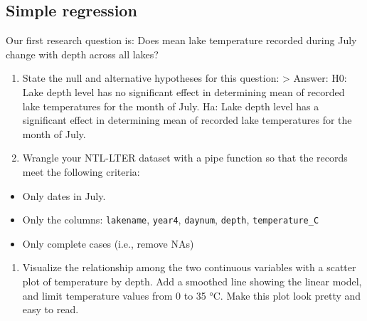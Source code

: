 \documentclass[
]{article}
\providecommand{\tightlist}{%
  \setlength{\itemsep}{0pt}\setlength{\parskip}{0pt}}
\begin{document}
\hypertarget{simple-regression}{%
\subsection{Simple regression}\label{simple-regression}}

Our first research question is: Does mean lake temperature recorded
during July change with depth across all lakes?

\begin{enumerate}
\def\labelenumi{\arabic{enumi}.}
\setcounter{enumi}{2}
\item
  State the null and alternative hypotheses for this question:
  \textgreater{} Answer: H0: Lake depth level has no significant effect
  in determining mean of recorded lake temperatures for the month of
  July. Ha: Lake depth level has a significant effect in determining
  mean of recorded lake temperatures for the month of July.
\item
  Wrangle your NTL-LTER dataset with a pipe function so that the records
  meet the following criteria:
\end{enumerate}

\begin{itemize}
\tightlist
\item
  Only dates in July.
\item
  Only the columns: \texttt{lakename}, \texttt{year4}, \texttt{daynum},
  \texttt{depth}, \texttt{temperature\_C}
\item
  Only complete cases (i.e., remove NAs)
\end{itemize}

\begin{enumerate}
\def\labelenumi{\arabic{enumi}.}
\setcounter{enumi}{4}
\tightlist
\item
  Visualize the relationship among the two continuous variables with a
  scatter plot of temperature by depth. Add a smoothed line showing the
  linear model, and limit temperature values from 0 to 35 °C. Make this
  plot look pretty and easy to read.
\end{enumerate}
\end{document}
